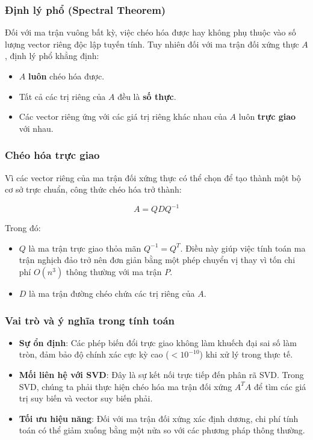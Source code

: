 \subsubsection{Định lý phổ (Spectral Theorem)}

Đối với ma trận vuông bất kỳ, việc chéo hóa được hay không phụ thuộc vào số lượng vector riêng độc lập tuyến tính. Tuy nhiên đối với ma trận đối xứng thực $A$, định lý phổ khẳng định:

\begin{itemize}[topsep=0pt, itemsep=2.5pt, leftmargin=1.5cm]
    \item $A$ \textbf{luôn} chéo hóa được.
    \item Tất cả các trị riêng của $A$ đều là \textbf{số thực}.
    \item Các vector riêng ứng với các giá trị riêng khác nhau của $A$ luôn \textbf{trực giao} với nhau.
\end{itemize}

\subsubsection{Chéo hóa trực giao}

Vì các vector riêng của ma trận đối xứng thực có thể chọn để tạo thành một bộ cơ sở trực chuẩn, công thức chéo hóa trở thành:

{\large
\begin{equation}
    A = QDQ^{-1}
\end{equation}
}

Trong đó:

\begin{itemize}[topsep=0pt, itemsep=2.5pt, leftmargin=1.5cm]
    \item $Q$ là ma trận trực giao thỏa mãn $Q^{-1} = Q^T$. Điều này giúp việc tính toán ma trận nghịch đảo trở nên đơn giản bằng một phép chuyển vị thay vì tốn chi phí $O(n^3)$ thông thường với ma trận $P$.
    \item $D$ là ma trận đường chéo chứa các trị riêng của $A$. 
\end{itemize}

\subsubsection{Vai trò và ý nghĩa trong tính toán}

\begin{itemize}[topsep=0pt, itemsep=2.5pt, leftmargin=1.5cm]
    \item \textbf{Sự ổn định}: Các phép biến đổi trực giao không làm khuếch đại sai số làm tròn, đảm bảo độ chính xác cực kỳ cao ($< 10^{-10}$) khi xử lý trong thực tế.
    \item \textbf{Mối liên hệ với SVD}: Đây là sự kết nối trực tiếp đến phân rã SVD. Trong SVD, chúng ta phải thực hiện chéo hóa ma trận đối xứng $A^TA$ để tìm các giá trị suy biến và vector suy biến phải. 
    \item \textbf{Tối ưu hiệu năng}: Đối với ma trận đối xứng xác định dương, chi phí tính toán có thể giảm xuống bằng một nửa so với các phương pháp thông thường.
\end{itemize}

